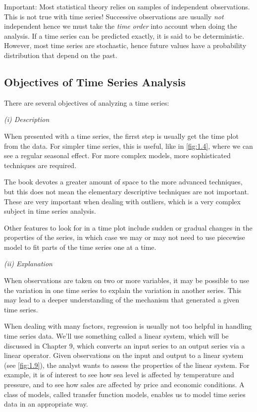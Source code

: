 Important: Most statistical theory relies on samples of independent observations. This is not true with time series! Successive observations are usually \textit{not} independent hence we must take the \textit{time order} into account when doing the analysis. If a time series can be predicted exactly, it is said to be deterministic. However, most time series are stochastic, hence future values have a probability distribution that depend on the past.



\subsection{Objectives of Time Series Analysis}
There are several objectives of analyzing a time series:

\textit{(i) Description}

When presented with a time series, the firrst step is usually get the time plot from the data. For simpler time series, this is useful, like in \cref{fig:1.4}, where we can see a regular seasonal effect. For more complex models, more sophisticated techniques are required.

The book devotes a greater amount of space to the more advanced techniques, but this does not mean the elementary descriptive techniques are not important. These are very important when dealing with outliers, which is a very complex subject in time series analysis.

Other features to look for in a time plot include sudden or gradual changes in the properties of the series, in which case we may or may not need to use piecewise model to fit parts of the time series one at a time.

\textit{(ii) Explanation}

When observations are taken on two or more variables, it may be possible to use the variation in one time series to explain the variation in another series. This may lead to a deeper understanding of the mechanism that generated a given time series.

When dealing with many factors, regression is usually not too helpful in handling time series data. We'll use something called a linear system, which will be discussed in Chapter 9, which converts an input series to an output series via a linear operator. Given observations on the input and output to a linear system (see \cref{fig:1.9}), the analyst wants to assess the properties of the linear system. For example, it is of interest to see how sea level is affected by temperature and pressure, and to see how sales are affected by price and economic conditions. 
A class of models, called transfer function models, enables us to model time series data in an appropriate way.

